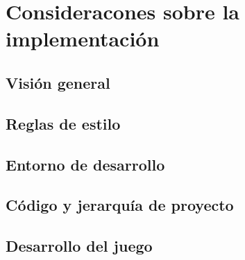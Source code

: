 \chapter{Consideracones sobre la implementación}

\section{Visión general}

\section{Reglas de estilo}

\section{Entorno de desarrollo}

\section{Código y jerarquía de proyecto}

\section{Desarrollo del juego}